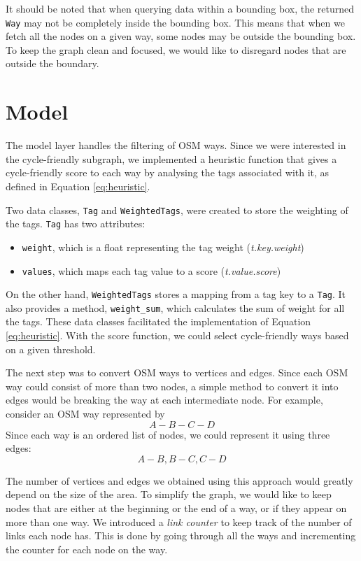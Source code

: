\documentclass[12pt,a4paper]{report}
\begin{document}
It should be noted that when querying data within a bounding box, the returned \texttt{Way} may not be completely inside the bounding box. This means that when we fetch all the nodes on a given way, some nodes may be outside the bounding box. To keep the graph clean and focused, we would like to disregard nodes that are outside the boundary.

\section{Model}
The model layer handles the filtering of OSM ways. Since we were interested in the cycle-friendly subgraph, we implemented a heuristic function that gives a cycle-friendly score to each way by analysing the tags associated with it, as defined in Equation \ref{eq:heuristic}.

Two data classes, \texttt{Tag} and \texttt{WeightedTags}, were created to store the weighting of the tags. \texttt{Tag} has two attributes:
\begin{itemize}
    \item \texttt{weight}, which is a float representing the tag weight (\textit{t.key.weight})
    \item \texttt{values}, which maps each tag value to a score (\textit{t.value.score})
\end{itemize}

On the other hand, \texttt{WeightedTags} stores a mapping from a tag key to a \texttt{Tag}. It also provides a method, \texttt{weight\_sum}, which calculates the sum of weight for all the tags. These data classes facilitated the implementation of Equation \ref{eq:heuristic}. With the score function, we could select cycle-friendly ways based on a given threshold.

The next step was to convert OSM ways to vertices and edges. Since each OSM way could consist of more than two nodes, a simple method to convert it into edges would be breaking the way at each intermediate node. For example, consider an OSM way represented by
\[A - B - C - D\]
Since each way is an ordered list of nodes, we could represent it using three edges:
\[A - B, B - C, C - D\]

The number of vertices and edges we obtained using this approach would greatly depend on the size of the area. To simplify the graph, we would like to keep nodes that are either at the beginning or the end of a way, or if they appear on more than one way. We introduced a \textit{link counter} to keep track of the number of links each node has. This is done by going through all the ways and incrementing the counter for each node on the way.
\end{document}
